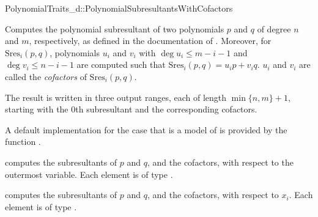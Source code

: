 \begin{ccRefConcept}{PolynomialTraits_d::PolynomialSubresultantsWithCofactors}
\ccDefinition

Computes the polynomial subresultant of two polynomials $p$ and $q$ of degree
$n$ and $m$, respectively, 
as defined in the documentation of .
Moreover, for $\mathrm{Sres}_i(p,q)$, polynomials $u_i$ and $v_i$
with $\deg u_i\leq m-i-1$ and $\deg v_i\leq n-i-1$ are computed 
such that $\mathrm{Sres}_i(p,q)=u_i p + v_i q$. $u_i$ and $v_i$ are called
the \emph{cofactors} of $\mathrm{Sres}_i(p,q)$.
 
The result is written in three output ranges, each of length $\min\{n,m\}+1$, 
starting with the $0$th subresultant and the corresponding cofactors.

A default implementation for the case that 
is a model of 
is provided by the function .

\ccOperations
{}
         { computes the subresultants of $p$ and $q$, and the cofactors, 
           with respect to the outermost variable. Each element is of type
           .}

         { computes the subresultants of $p$ and $q$, and the cofactors, 
           with respect to $x_i$. Each element is of type
           .}


\ccSeeAlso

\\
\\
\\
\\

\end{ccRefConcept}
